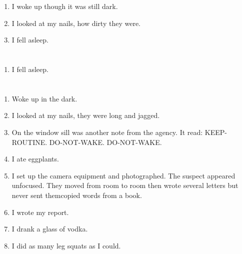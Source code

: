 \documentclass{article}
\begin{document}
    \begin{enumerate}
    
    \item I woke up though it was still dark.\\
    
    \item I looked at my nails, how dirty they were.\\
    
    \item I fell asleep.\\
    
    \end{enumerate}
     
    \newpage
    
    \section{}
    
    \begin{enumerate}
    
    \item I fell asleep.\\
    
    \end{enumerate}
     
    \newpage
    
    \section{}
    
    \begin{enumerate}
    
    \item Woke up in the dark.\\
    
    \item I looked at my nails, they were long and jagged.\\
    
    \item On the window sill was another note from the agency. It read: KEEP-ROUTINE. DO-NOT-WAKE. DO-NOT-WAKE.\\
    
    \item I ate eggplants.\\
    
    \item I set up the camera equipment and photographed. The suspect appeared unfocused. They moved from room to room then wrote several letters but never sent themcopied words from a book.\\
    
    \item I wrote my report.\\
    
    \item I drank a glass of vodka.\\
    
    \item I did as many leg squats as I could.\\
    
    \end{enumerate}
     
\end{document}
